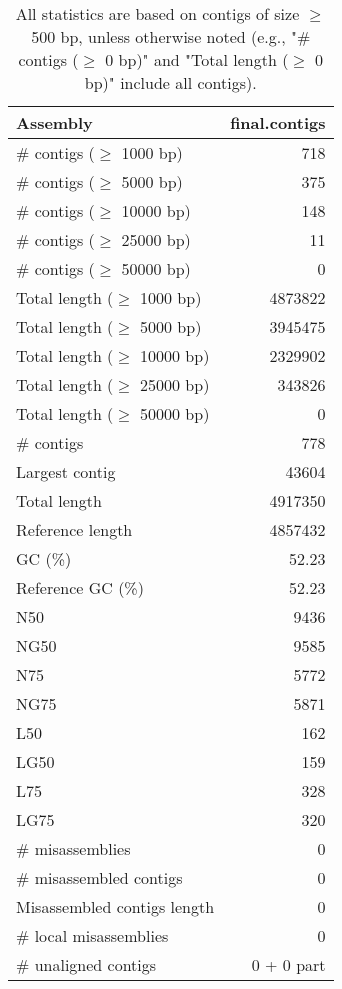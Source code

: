 \documentclass[12pt,a4paper]{article}
\begin{document}
\begin{table}[ht]
\begin{center}
\caption{All statistics are based on contigs of size $\geq$ 500 bp, unless otherwise noted (e.g., "\# contigs ($\geq$ 0 bp)" and "Total length ($\geq$ 0 bp)" include all contigs).}
\begin{tabular}{|l*{1}{|r}|}
\hline
Assembly & final.contigs \\ \hline
\# contigs ($\geq$ 1000 bp) & 718 \\ \hline
\# contigs ($\geq$ 5000 bp) & 375 \\ \hline
\# contigs ($\geq$ 10000 bp) & 148 \\ \hline
\# contigs ($\geq$ 25000 bp) & 11 \\ \hline
\# contigs ($\geq$ 50000 bp) & 0 \\ \hline
Total length ($\geq$ 1000 bp) & 4873822 \\ \hline
Total length ($\geq$ 5000 bp) & 3945475 \\ \hline
Total length ($\geq$ 10000 bp) & 2329902 \\ \hline
Total length ($\geq$ 25000 bp) & 343826 \\ \hline
Total length ($\geq$ 50000 bp) & 0 \\ \hline
\# contigs & 778 \\ \hline
Largest contig & 43604 \\ \hline
Total length & 4917350 \\ \hline
Reference length & 4857432 \\ \hline
GC (\%) & 52.23 \\ \hline
Reference GC (\%) & 52.23 \\ \hline
N50 & 9436 \\ \hline
NG50 & 9585 \\ \hline
N75 & 5772 \\ \hline
NG75 & 5871 \\ \hline
L50 & 162 \\ \hline
LG50 & 159 \\ \hline
L75 & 328 \\ \hline
LG75 & 320 \\ \hline
\# misassemblies & 0 \\ \hline
\# misassembled contigs & 0 \\ \hline
Misassembled contigs length & 0 \\ \hline
\# local misassemblies & 0 \\ \hline
\# unaligned contigs & 0 + 0 part \\ \hline

\end{tabular}
\end{center}
\end{table}
\end{document}
